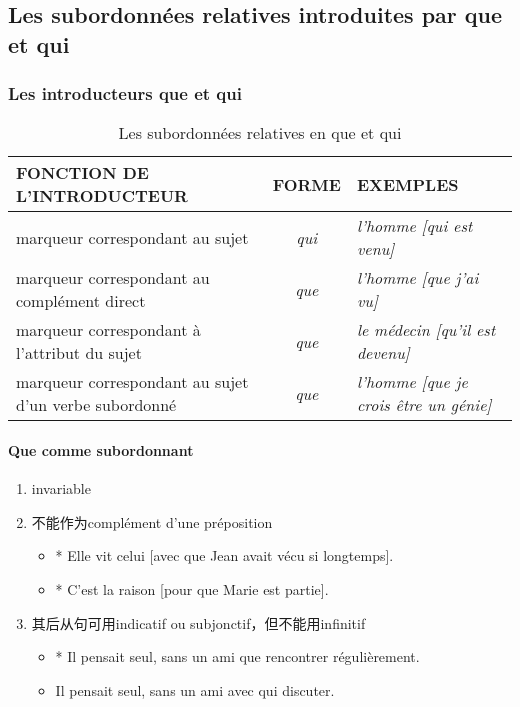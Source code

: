 \documentclass[UTF8]{report}
\begin{document}
\subsection{Les subordonnées relatives introduites par que et qui}
\subsubsection{Les introducteurs que et qui}
\begin{table}[H]
    \centering
    \small
    \begin{tabular}{|l|c|l|}
    \hline
    \rowcolor{cyan!20}
    \textbf{FONCTION DE L'INTRODUCTEUR} & \textbf{FORME} & \textbf{EXEMPLES} \\
    \hline
    marqueur correspondant au sujet & \textit{qui} & \textit{l'homme [qui est venu]} \\
    \hline
    marqueur correspondant au complément direct & \textit{que} & \textit{l'homme [que j'ai vu]} \\
    \hline
    marqueur correspondant à l'attribut du sujet & \textit{que} & \textit{le médecin [qu'il est devenu]} \\
    \hline
    marqueur correspondant au sujet d'un verbe subordonné & \textit{que} & \textit{l'homme [que je crois être un génie]} \\
    \hline
    \end{tabular}
    \caption{Les subordonnées relatives en que et qui}
\end{table}

\paragraph{Que comme subordonnant}
\begin{enumerate}
    \item invariable 
    \item 不能作为complément d’une préposition
    \begin{itemize}
        \item * Elle vit celui [avec que Jean avait vécu si longtemps].
        \item * C’est la raison [pour que Marie est partie].
    \end{itemize}
    \item 其后从句可用indicatif ou subjonctif，但不能用infinitif
    \begin{itemize}
        \item * Il pensait seul, sans un ami que rencontrer régulièrement.
        \item Il pensait seul, sans un ami avec qui discuter.
    \end{itemize}
\end{enumerate}
\end{document}
